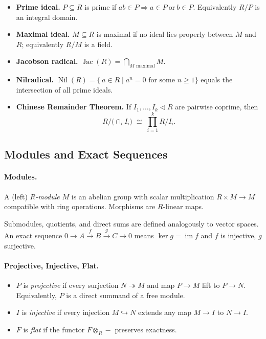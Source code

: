 \begin{itemize}
    \item \textbf{Prime ideal.} \(P\!\subseteq\!R\) is prime if \(ab\in P\Rightarrow a\in P\ \text{or}\ b\in P\).  
          Equivalently \(R/P\) is an integral domain.
    \item \textbf{Maximal ideal.} \(M\!\subseteq\!R\) is maximal if no ideal lies properly between \(M\) and~\(R\); equivalently \(R/M\) is a field.
    \item \textbf{Jacobson radical.}  
          \(\operatorname{Jac}(R)=\bigcap_{M\text{ maximal}} M.\)
    \item \textbf{Nilradical.}
          \(\operatorname{Nil}(R)=\{\,a\in R\mid a^{n}=0 \text{ for some }n\ge1\}\)
          equals the intersection of all prime ideals.
    \item \textbf{Chinese Remainder Theorem.}
          If \(I_1,\ldots,I_k\lhd R\) are pairwise coprime, then
          \[
          R/\bigl(\cap_{i}I_i\bigr)\;\cong\;
          \prod_{i=1}^{k} R/I_i.
          \]
\end{itemize}

\subsection{Modules and Exact Sequences}

\paragraph{Modules.}
A (left) \emph{\(R\)-module} \(M\) is an abelian group
with scalar multiplication \(R\times M\!\to\!M\)
compatible with ring operations.  
Morphisms are \(R\)-linear maps.

\medskip\noindent
Submodules, quotients, and direct sums are defined analogously to vector spaces.
An exact sequence
\(0\!\to\!A\xrightarrow{f}B\xrightarrow{g}C\!\to\!0\)
means \(\ker g=\operatorname{im}f\) and \(f\) is injective, \(g\) surjective.

\paragraph{Projective, Injective, Flat.}
\begin{itemize}
    \item \(P\) is \emph{projective} if every surjection \(N\twoheadrightarrow M\) and map \(P\to M\)
          lift to \(P\to N\).
          Equivalently, \(P\) is a direct summand of a free module.
    \item \(I\) is \emph{injective} if every injection \(M\hookrightarrow N\)
          extends any map \(M\to I\) to \(N\to I\).
    \item \(F\) is \emph{flat} if the functor
          \(F\otimes_R -\) preserves exactness.
\end{itemize}


